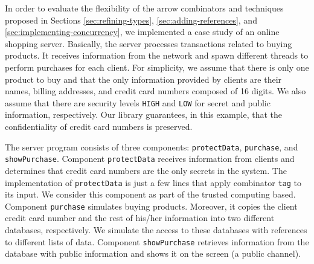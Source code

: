 \documentclass[times, 10pt,twocolumn]{article}
\begin{document}
In order to evaluate the 
flexibility  of the arrow combinators and techniques 
proposed in Sections \ref{sec:refining-types}, \ref{sec:adding-references},
and %
\ref{sec:implementing-concurrency}, we implemented a
case study of an online shopping server.
%
%
Basically, the server processes transactions related to
buying products. It receives information from the network 
and spawn different threads to perform 
purchases for each client. For simplicity, we assume that there is
only one product to buy and that the only information provided by
clients are their names, billing addresses, and credit card numbers
composed of 16 digits.
We also assume that there are security levels \texttt{HIGH} and 
\texttt{LOW} for secret and public information,
respectively. Our library guarantees, in this example, that the
confidentiality of credit card numbers is preserved. 

The server program consists of three components:
\texttt{protectData}, \texttt{purchase}, and 
\texttt{showPurchase}. Component \texttt{protectData} 
receives information from clients and determines that 
credit card numbers are the only secrets in the system.
The implementation of \texttt{protectData} is just a
few lines that apply combinator \texttt{tag} to its input. 
We consider this component as part of the trusted 
computing based.
Component \texttt{purchase} simulates buying products. 
Moreover, it copies the client credit card number and the
rest of his/her information into two different databases, respectively.  
We simulate the access to these
databases with references to different lists of data. 
Component
\texttt{showPurchase} retrieves information from the database with
public information and shows it on the screen (a
public channel). 
%
\end{document}
